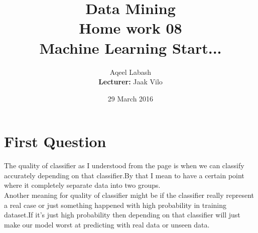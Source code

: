 \documentclass{article}
\title{Data Mining\\
		Home work 08\\Machine Learning Start... }
\author{Aqeel Labash\\ \textbf{Lecturer:} Jaak Vilo}
\date{29 March 2016}
\begin{document}
	\maketitle
\section*{First Question}
The quality of classifier as I understood from the page is when we can classify accurately depending on that classifier.By that I mean to have a certain point where it completely separate data into two groups.\\ Another meaning for quality of classifier might be if the classifier really represent a real case or just something happened with high probability in training dataset.If it's just high probability then depending on that classifier will just make our model worst at predicting with real data or unseen data.\\
\end{document}
